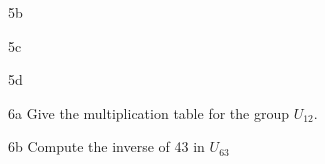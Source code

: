 \begin{question}{5b}

\end{question}

\begin{question}{5c}

\end{question}

\begin{question}{5d}

\end{question}






\begin{question}{6a}
Give the multiplication table for the group $U_{12}$.
\end{question}

\begin{question}{6b}
Compute the inverse of 43 in $U_{63}$
\end{question}




